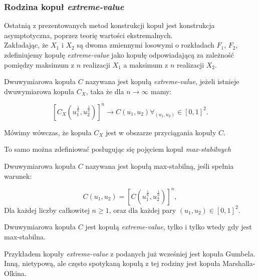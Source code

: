 \subsubsection{Rodzina kopuł \emph{extreme-value}}

Ostatnią z prezentowanych metod konstrukcji kopuł jest konstrukcja asymptotyczna, poprzez teorię wartości ekstremalnych.\\
Zakładając, że $X_1$ i $X_2$ są dwoma zmiennymi losowymi o rozkładach $F_1$, $F_2$, zdefiniujemy kopułę \emph{extreme-value} jako kopułę odpowiadającą za zależność pomiędzy maksimum z $n$ realizacji $X_1$ a maksimum z $n$ realizacji $X_2$. 

\begin{df}
	Dwuwymiarowa kopuła $C$ nazywana jest kopułą \emph{extreme-value}, jeżeli istnieje dwuwymiarowa kopuła $C_X$, taka że dla $n\to\infty$ mamy:
	
	$$ [C_X(u_1^{\frac{1}{n}}, u_2^{\frac{1}{n}})]^n \to C(u_1, u_2) \forall_{(u_1, u_2)}\in [0,1]^2.$$
	
	Mówimy wówczas, że kopuła $C_X$ jest w obszarze przyciągania kopuły $C$.
\end{df}

To samo można zdefiniować posługując się pojęciem kopuł \emph{max-stabilnych}
\begin{df}
	Dwuwymiarowa kopuła $C$ nazywana jest kopułą max-stabilną, jeśli spełnia warunek:
	
	$$ C(u_1, u_2) = [C(u_1^{\frac{1}{n}}, u_2^{\frac{1}{n}})]^n,$$
	Dla każdej liczby całkowitej $n\geqslant 1$, oraz dla każdej pary ${(u_1, u_2)}\in [0,1]^2.$
	
\end{df}
\begin{thm}
	Dwuwymiarowa kopuła $C$ jest kopułą \emph{extreme-value}, tylko i tylko wtedy gdy jest max-stabilna.
\end{thm}

Przykładem kopuły \emph{extreme-value} z podanych już wcześniej jest kopuła Gumbela. Inną, nietypową, ale często spotykaną kopułą z tej rodziny jest kopuła Marshalla-Olkina.

